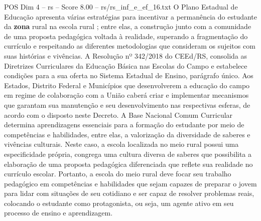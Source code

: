 \begin{textsample}{POS Dim 4 – rs – Score 8.00 – rs/rs\_inf\_e\_ef\_16.txt}
O Plano Estadual de Educação apresenta várias estratégias para incentivar a permanência do estudante da \textbf{zona} rural na escola rural ; entre elas, a construção junto com a comunidade de uma proposta pedagógica voltada à realidade, superando a fragmentação do currículo e respeitando as diferentes metodologias que consideram os sujeitos com suas histórias e vivências.
A Resolução nº 342/2018 do CEEd/RS, consolida as Diretrizes Curriculares da Educação Básica nas Escolas do Campo e estabelece condições para a sua oferta no Sistema Estadual de Ensino, parágrafo único.
Aos Estados, Distrito Federal e Municípios que desenvolverem a educação do campo em regime de colaboração com a União caberá criar e implementar mecanismos que garantam sua manutenção e seu desenvolvimento nas respectivas esferas, de acordo com o disposto neste Decreto.
A Base Nacional Comum Curricular determina aprendizagens essenciais para a formação do estudante por meio de competências e habilidades, entre elas, a valorização da diversidade de saberes e vivências culturais.
Neste caso, a escola localizada no meio rural possui uma especificidade própria, congrega uma cultura diversa de saberes que possibilita a elaboração de uma proposta pedagógica diferenciada que reflete sua realidade no currículo escolar.
Portanto, a escola do meio rural deve focar seu trabalho pedagógico em competências e habilidades que sejam capazes de preparar o jovem para lidar com situações de seu cotidiano e ser capaz de resolver problemas reais, colocando o estudante como protagonista, ou seja, um agente ativo em seu processo de ensino e aprendizagem.

\end{textsample}
